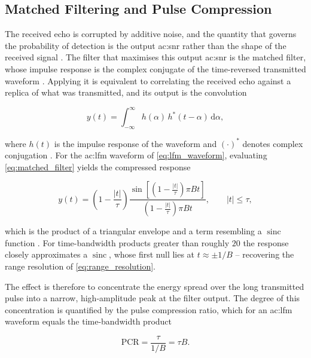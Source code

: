 \subsection{Matched Filtering and Pulse Compression}\label{sec:matched_filtering}

The received echo is corrupted by additive noise, and the quantity that governs the probability of detection is the output \gls{ac:snr} rather than the shape of the received signal \cite{marthinmon}. The filter that maximises this output \gls{ac:snr} is the matched filter, whose impulse response is the complex conjugate of the time-reversed transmitted waveform \cite{pomr}. Applying it is equivalent to correlating the received echo against a replica of what was transmitted, and its output is the convolution

\begin{equation}
  y(t) = \int_{-\infty}^{\infty} h(\alpha)\,h^{*}(t-\alpha)\,\mathrm{d}\alpha ,
  \label{eq:matched_filter}
\end{equation}

where $h(t)$ is the impulse response of the waveform and $(\cdot)^{*}$ denotes complex conjugation \cite{marthinmon}. For the \gls{ac:lfm} waveform of \eqref{eq:lfm_waveform}, evaluating \eqref{eq:matched_filter} yields the compressed response

\begin{equation}
  y(t) = \left(1 - \frac{|t|}{\tau}\right)
         \frac{\sin\left[\left(1 - \frac{|t|}{\tau}\right)\pi B t\right]}
              {\left(1 - \frac{|t|}{\tau}\right)\pi B t},
  \qquad |t| \leq \tau ,
  \label{eq:lfm_compressed}
\end{equation}

which is the product of a triangular envelope and a term resembling a $\operatorname{sinc}$ function \cite{pomr}. For time-bandwidth products greater than roughly $20$ the response closely approximates a $\operatorname{sinc}$, whose first null lies at $t \approx \pm 1/B$ -- recovering the range resolution of \eqref{eq:range_resolution}.

The effect is therefore to concentrate the energy spread over the long transmitted pulse into a narrow, high-amplitude peak at the filter output. The degree of this concentration is quantified by the pulse compression ratio, which for an \gls{ac:lfm} waveform equals the time-bandwidth product

\begin{equation}
  \text{PCR} = \frac{\tau}{1/B} = \tau B .
  \label{eq:pulse_compression_ratio}
\end{equation}

